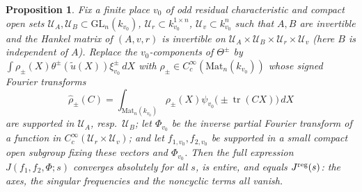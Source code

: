 \documentclass[11pt,oneside,notitlepage]{book}
\numberwithin{equation}{section}
\theoremstyle{plain}
\newtheorem{proposition}[theorem]{Proposition}
\theoremstyle{definition}
\newcommand{\GL}{\mathrm{GL}}
\newcommand{\Mat}{\mathrm{Mat}}
\newcommand{\tr}{\operatorname{tr}}
\begin{document}
\begin{proposition}\label{prop:A-full}
Fix a finite place $v_0$ of odd residual characteristic and compact open sets $\mathcal U_A,\mathcal U_B\subset\GL_n(k_{v_0})$, $\mathcal U_r\subset k_{v_0}^{1\times n}$, $\mathcal U_v\subset k_{v_0}^n$ such that $A,B$ are invertible and the Hankel matrix of $(A,v,r)$ is invertible on $\mathcal U_A\times\mathcal U_B\times\mathcal U_r\times\mathcal U_v$ (here $B$ is independent of $A$). Replace the $v_0$-components of $\Theta^\pm$ by $\int\rho_\pm(X)\theta^\pm(\tilde u(X))\xi^\pm_{v_0}\,dX$ with $\rho_\pm\in C_c^\infty(\Mat_n(k_{v_0}))$ whose signed Fourier transforms
\[
\widehat\rho_\pm(C)=\int_{\Mat_n(k_{v_0})}\rho_\pm(X)\psi_{v_0}\bigl(\pm\tr(CX)\bigr)\,dX
\]
are supported in $\mathcal U_A$, resp.\ $\mathcal U_B$; let $\Phi_{v_0}$ be the inverse partial Fourier transform of a function in $C_c^\infty(\mathcal U_r\times\mathcal U_v)$; and let $f_{1,v_0},f_{2,v_0}$ be supported in a small compact open subgroup fixing these vectors and $\Phi_{v_0}$. Then the full expression $J(f_1,f_2,\Phi;s)$ converges absolutely for all $s$, is entire, and equals $J^{\rm reg}(s)$: the axes, the singular frequencies and the noncyclic terms all vanish.
\end{proposition}
\end{document}
